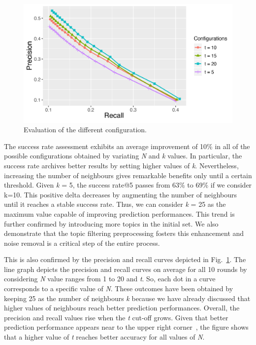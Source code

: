 \begin{figure}[t!]
	\centering
	\includegraphics[width=.95\linewidth]{figs/PrecisionRecallCurve.png}
	\caption{Evaluation of the different configuration.}
	\label{fig:configs}
\end{figure}
The success rate assessment exhibits an average improvement of 10\% in all of the possible configurations obtained by variating \emph{N} and \emph{k} values. In particular, the success rate archives better results by setting higher values of \emph{k}. Nevertheless, increasing the number of neighbours gives remarkable benefits only until a certain threshold. Given \emph{k} = 5, the success rate@5 passes from 63\% to 69\% if we consider k=10. This positive delta decreases by augmenting the number of neighbours until it reaches a stable success rate. Thus, we can consider \emph{k} = 25 as the maximum value capable of improving prediction performances. This trend is further confirmed by introducing more topics in the initial set. We also demonstrate that the topic filtering preprocessing fosters this enhancement and noise removal is a critical step of the entire process.

This is also confirmed by the precision and recall curves depicted in Fig.~\ref{fig:configs}. 
The line graph depicts the precision and recall curves on average for all 10 rounds by considering \emph{N} value ranges from 1 to 20 and \emph{t}. So, each dot in a curve corresponds to a specific value of \emph{N}. 
These outcomes have been obtained by keeping 25 as the number of neighbours \emph{k} because we have already discussed that higher values of neighbours reach better prediction performances. Overall, the precision and recall values rise when the \emph{t} cut-off grows. Given that better prediction performance appears near to the upper right corner~\cite{DiNoia:2012:LOD:2362499.2362501}, the figure shows that a higher value of \emph{t} reaches better accuracy for all values of \emph{N}.

